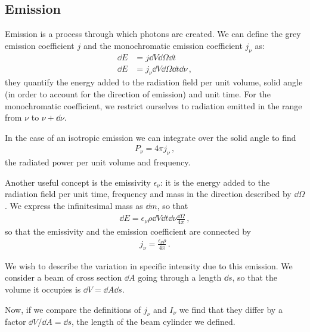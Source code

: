 \documentclass[main.tex]{subfiles}
\begin{document}
\subsection{Emission}

Emission is a process through which photons are created. 
We can define the grey emission coefficient \(j\) and the monochromatic emission coefficient \(j_{\nu }\) as: 
%
\begin{subequations}
\begin{align}
\dd{E} &= j \dd{V} \dd{\Omega } \dd{t}  \\
\dd{E} &= j_{\nu } \dd{V} \dd{\Omega } \dd{t} \dd{\nu }
\,,
\end{align}
\end{subequations}
%
they quantify the energy added to the radiation field per unit volume, solid angle (in order to account for the direction of emission) and unit time. For the monochromatic coefficient, we restrict ourselves to radiation emitted in the range from \(\nu \) to \(\nu + \dd{\nu }\).

In the case of an isotropic emission we can integrate over the solid angle to find  
%
\begin{align}
P_{\nu } = 4 \pi j_{\nu }
\,,
\end{align}
%
the radiated power per unit volume and frequency. 

Another useful concept is the emissivity \(\epsilon_{\nu }\): it is the energy added to the radiation field per unit time, frequency and mass in the direction described by \(\dd{\Omega }\). We express the infinitesimal mass as \(\dd{m}\), so that 
%
\begin{align}
\dd{E} = \epsilon_{\nu } \rho \dd{V} \dd{t} \dd{\nu } \frac{ \dd{\Omega }}{4\pi }
\,,
\end{align}
%
so that the emissivity and the emission coefficient are connected by 
%
\begin{align}
j_{\nu } = \frac{\epsilon_{\nu } \rho }{4 \pi }
\,.
\end{align}

We wish to describe the variation in specific intensity due to this emission. 
We consider a beam of cross section \(\dd{A}\) going through a length \(\dd{s}\), so that the volume it occupies is \(\dd{V} = \dd{A} \dd{s}\). 

Now, if we compare the definitions of \(j_{\nu }\) and \(I_{\nu }\) we find that they differ by a factor \(\dd{V} / \dd{A} = \dd{s}\), the length of the beam cylinder we defined. 
\end{document}
